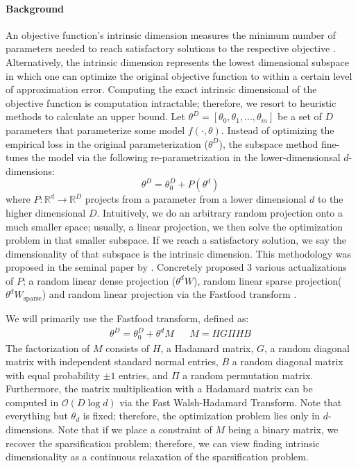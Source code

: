 \documentclass{article} \usepackage{iclr2020_conference,times}
\begin{document}
\paragraph{Background}
An objective function's intrinsic dimension measures the minimum number of parameters needed to reach satisfactory solutions to the respective objective \citep{intrinsic_dimension}. Alternatively, the intrinsic dimension represents the lowest dimensional subspace in which one can optimize the original objective function to within a certain level of approximation error. Computing the exact intrinsic dimensional of the objective function is computation intractable; therefore, we resort to heuristic methods to calculate an upper bound.
Let $\theta^{D}=\left[\theta_0, \theta_1,..., \theta_m\right]$ be a set of $D$ parameters that parameterize some model $f(\cdot, \theta)$. Instead of optimizing the empirical loss in the original parameterization ($\theta^{D}$), the subspace method fine-tunes the model via the following re-parametrization in the lower-dimensionsal $d$-dimensions:
\begin{equation}
    \theta^{D} = \theta^{D}_0 + P(\theta^{d})
    \label{eq:subspace_def}
\end{equation}
where $P: \mathbb{R}^d \rightarrow \mathbb{R}^D$ projects from a parameter from a lower dimensional $d$ to the higher dimensional $D$. Intuitively, we do an arbitrary random projection onto a much smaller space; usually, a linear projection, we then solve the optimization problem in that smaller subspace. If we reach a satisfactory solution, we say the dimensionality of that subspace is the intrinsic dimension. This methodology was proposed in the seminal paper by \cite{intrinsic_dimension}. Concretely \cite{intrinsic_dimension} proposed 3 various actualizations of $P$; a random linear dense projection ($\theta^{d}W$), random linear sparse projection($\theta^{d}W_{\text{sparse}}$) and random linear projection via the Fastfood transform \citep{fastfood}.

We will primarily use the Fastfood transform, defined as:
\begin{align}
    \theta^{D} = \theta^{D}_0 + \theta^{d}M && M=HG\Pi HB \label{eq:did}
\end{align}
The factorization of $M$ consists of $H$, a Hadamard matrix, $G$, a random diagonal matrix with independent standard normal entries, $B$ a random diagonal matrix with equal probability $\pm 1$ entries, and $\Pi$ a random permutation matrix. Furthermore, the matrix multiplication with a Hadamard matrix can be computed in $\mathcal{O}(D \log{d})$ via the Fast Walsh-Hadamard Transform. Note that everything but $\theta_d$ is fixed; therefore, the optimization problem lies only in $d$-dimensions. Note that if we place a constraint of $M$ being a binary matrix, we recover the sparsification problem; therefore, we can view finding intrinsic dimensionality as a continuous relaxation of the sparsification problem. 
\end{document}
